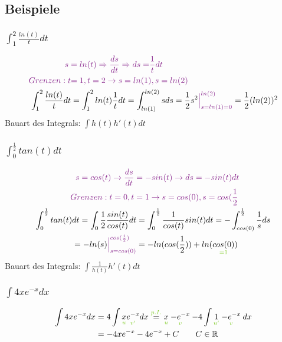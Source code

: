\documentclass[12pt,a4paper]{article}%
\numberwithin{equation}{section}
\newcommand{\R}{\mathbb{R}} %
\def\colBord#1{\begingroup\color{Fuchsia}{#1}\endgroup}
\def\colGreen#1{\begingroup\color{LimeGreen}{#1}\endgroup}
\def\usGreen#1#2{\underset{\colGreen{#1}}{#2}}
\begin{document}
\subsection{Beispiele}
\subsubsection{$\int_1^2 \frac{ln(t)}{t} dt$}
\begin{align}
\colBord{s }\; &\colBord{= ln(t) \Rightarrow \frac{ds}{dt} \Rightarrow ds} \;\colBord{=} \colBord{\frac{1}{t}dt} \nonumber\\
\colBord{Grenzen: t } &\colBord{=} \;\colBord{1, t=2 \rightarrow s = ln(1), s = ln(2)} \nonumber \\
\int_1^2 \frac{ln(t)}{t} dt &= \int_1^2 ln(t) \frac{1}{t} dt = \int_{ln(1)}^{ln(2)} s ds 
= \frac{1}{2} s^2 \colBord{\Big|_{s = ln(1) = 0}^{ln(2)}} = \frac{1}{2}(ln(2))^2 
\end{align}
Bauart des Integrals: $\int h(t)h'(t)dt$

\subsubsection{$\int_0^{\frac{1}{2}} tan(t) dt$}
\begin{align}
\colBord{s = cos(t) \rightarrow \frac{ds}{dt}} \; &\colBord{=} \; \colBord{-sin(t) \rightarrow ds = -sin(t) dt} \nonumber \\
\colBord{Grenzen: t = 0, t } \; &\colBord{=} \; \colBord{1 \rightarrow s = cos(0), s = cos(\frac{1}{2}} \nonumber \\
\int_0^{\frac{1}{2}} tan(t) dt = \int_{0}{\frac{1}{2}} \frac{sin(t)}{cos(t)} dt &= \int_0 ^{\frac{1}{2}} \frac{1}{cos(t)} sin(t) dt 
= - \int_{cos(0)}^{\frac{1}{2}} \frac{1}{s} ds \nonumber \\
= -ln(s)\colBord{\Big|_{s = cos(0)}^{cos(\frac{1}{2})}} &= -ln(cos(\frac{1}{2})) + ln(\usGreen{=1}{cos(0)})
\end{align}
Bauart des Integrals: $\int \frac{1}{h(t)}h'(t)dt$

\subsubsection{$\int 4xe^{-x} dx$}
\begin{align}
\int 4xe^{-x} dx &= 4 \int \usGreen{u}{x} \usGreen{v'}{e^{-x}} dx 
\overset{\colGreen{p.I.}}{=} \usGreen{u}{x} \usGreen{v}{-e^{-x}} 
-4\int \usGreen{u'}{1} \usGreen{v}{-e^{-x}} dx \nonumber\\
&= -4xe^{-x} -4e^{-x} + C 
\qquad C\in\R \label{eq:ex1}
\end{align}
\end{document}
